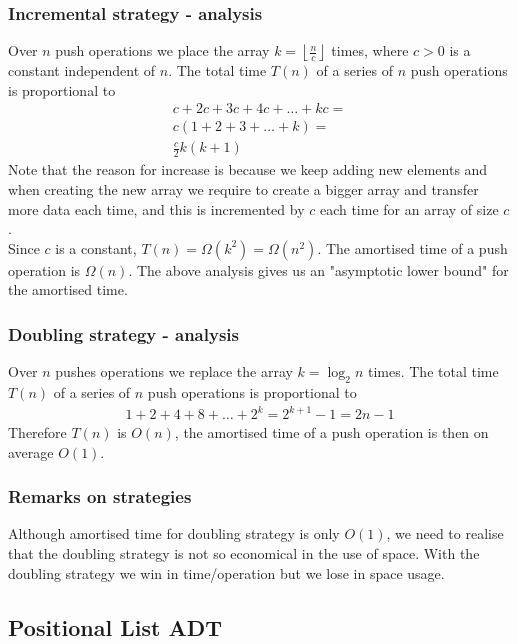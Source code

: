 \documentclass[a4paper]{article}
\theoremstyle{plain}
\theoremstyle{definition}
\theoremstyle{remark}
\begin{document}
\subsubsection{Incremental strategy - analysis}
Over $n$ push operations we place the array $k = \left\lfloor \frac{n}{c} \right\rfloor$ times, where $c>0$ is a constant independent of $n$. The total time $T(n)$ of a series of $n$ push operations is proportional to 
\begin{align*}
	c+2c+3c+4c+\ldots+kc = \\
	c(1+2+3+\ldots+k) = \\
	\frac{c}{2}k(k+1)
\end{align*}
Note that the reason for increase is because we keep adding new elements and when creating the new array we require to create a bigger array and transfer more data each time, and this is incremented by $c$ each time for an array of size $c$. \\
Since $c$ is a constant, $T(n) = \Omega(k^2) = \Omega(n^2)$.
The amortised time of a push operation is $\Omega(n)$. The above analysis gives us an "asymptotic lower bound" for the amortised time.
\subsubsection{Doubling strategy - analysis}
Over $n$ pushes operations we replace the array $k = \log_2 n$ times. The total time $T(n)$ of a series of $n$ push operations is proportional to
\begin{align*}
	1+2+4+8+\ldots+2^{k} = 2^{k+1}-1 = 2n-1
\end{align*}
Therefore $T(n)$ is $O(n)$, the amortised time of a push operation is then on average $O(1)$.
\subsubsection{Remarks on strategies}
Although amortised time for doubling strategy is only $O(1)$, we need to realise that the doubling strategy is not so economical in the use of space. With the doubling strategy we win in time/operation but we lose in space usage.
\subsection{Positional List ADT}
\end{document}
